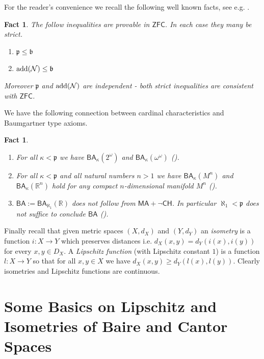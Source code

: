 \documentclass[leqno,11pt]{amsart}
\newtheorem{fact}[theorem]{Fact}
\theoremstyle{definition}
\theoremstyle{remark}
\def\Null{\mathcal N}
\def\ZFC{\mathsf{ZFC}}
\def\MA{\mathsf{MA}}
\def\BA{\mathsf{BA}}
\def\baire{\omega^\omega}
\def\cantor{2^\omega}
\def\mfb{\mathfrak b}
\def\CH {\mathsf{CH}}
\def\mfp{\mathfrak{p}}
\def\add{{\rm add}}
\begin{document}
For the reader's convenience we recall the following well known facts, see e.g. \cite{BlassHB}.

\begin{fact}
    The follow inequalities are provable in $\ZFC$. In each case they many be strict.

    \begin{enumerate}
        \item $\mfp \leq \mfb$
        \item $\add(\Null) \leq \mfb$
    \end{enumerate}
    Moreover $\mfp$ and $\add(\Null)$ are independent - both strict inequalities are consistent with $\ZFC$.
\end{fact}

We have the following connection between cardinal characteristics and Baumgartner type axioms.

\begin{fact} \label{BAfacts}
    \begin{enumerate}
        \item For all $\kappa < \mfp$ we have $\BA_\kappa (\cantor)$ and $\BA_\kappa (\baire)$ (\cite{BaldwinBeaudoin89}).
        \item For all $\kappa < \mfp$ and all natural numbers $n > 1$ we have $\BA_\kappa (M^n)$ and $\BA_\kappa (\mathbb R^n)$ hold for any compact $n$-dimensional manifold $M^n$ (\cite{Stepranswatson87}).
        \item $\BA := 
        \BA_{\aleph_1} (\mathbb R)$ does not follow from $\MA + \neg \CH$. In particular $\aleph_1 < \mfp$ does not suffice to conclude $\BA$ (\cite{AvrahamShelah81}).
    \end{enumerate}
\end{fact}

Finally recall that given metric spaces $(X, d_X)$ and $(Y, d_Y)$ an {\em isometry} is a function $i:X \to Y$ which preserves distances i.e. $d_X(x, y) = d_Y(i(x), i(y))$ for every $x, y \in D_X$. A {\em Lipschitz function} (with Lipschitz constant $1$) is a function $l:X \to Y$ so that for all $x, y \in X$ we have $d_X(x, y) \geq d_Y(l(x), l(y))$. Clearly isometries and Lipschitz functions are continuous. 

\section{Some Basics on Lipschitz and Isometries of Baire and Cantor Spaces}
\end{document}
